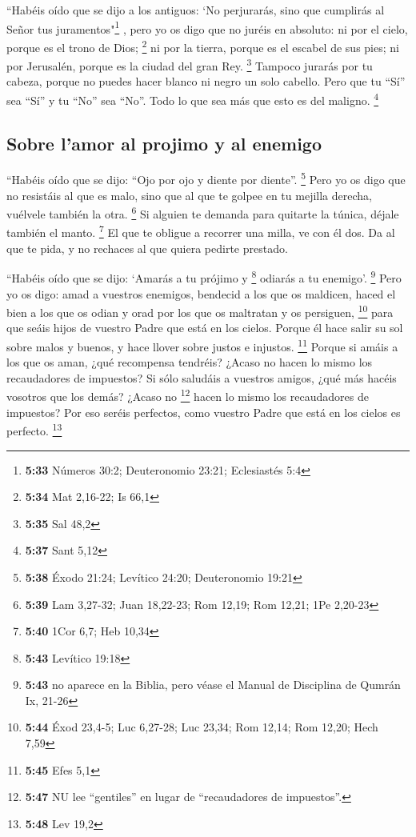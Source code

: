\begin{paracol}{2}
 ``Habéis oído que se dijo a los antiguos: `No
perjurarás, sino que cumplirás al Señor tus juramentos"\footnote{\textbf{5:33}
  Números 30:2; Deuteronomio 23:21; Eclesiastés 5:4} , 
pero yo os digo que no juréis en absoluto: ni por el cielo, porque es el
trono de Dios; \footnote{\textbf{5:34} Mat 2,16-22; Is 66,1}
 ni por la tierra, porque es el escabel de sus pies; ni
por Jerusalén, porque es la ciudad del gran Rey. \footnote{\textbf{5:35}
  Sal 48,2}  Tampoco jurarás por tu cabeza, porque no
puedes hacer blanco ni negro un solo cabello.  Pero que
tu ``Sí'' sea ``Sí'' y tu ``No'' sea ``No''. Todo lo que sea más que
esto es del maligno. \footnote{\textbf{5:37} Sant 5,12}

\hypertarget{sobre-lamor-al-projimo-y-al-enemigo}{%
\subsection{Sobre l'amor al projimo y al
enemigo}\label{sobre-lamor-al-projimo-y-al-enemigo}}

 ``Habéis oído que se dijo: ``Ojo por ojo y diente por
diente''. \footnote{\textbf{5:38} Éxodo 21:24; Levítico 24:20;
  Deuteronomio 19:21}  Pero yo os digo que no resistáis
al que es malo, sino que al que te golpee en tu mejilla derecha,
vuélvele también la otra. \footnote{\textbf{5:39} Lam 3,27-32; Juan
  18,22-23; Rom 12,19; Rom 12,21; 1Pe 2,20-23}  Si
alguien te demanda para quitarte la túnica, déjale también el manto.
\footnote{\textbf{5:40} 1Cor 6,7; Heb 10,34}  El que te
obligue a recorrer una milla, ve con él dos.  Da al que
te pida, y no rechaces al que quiera pedirte prestado.

 ``Habéis oído que se dijo: `Amarás a tu prójimo y
\footnote{\textbf{5:43} Levítico 19:18} odiarás a tu enemigo'.
\footnote{\textbf{5:43} no aparece en la Biblia, pero véase el Manual de
  Disciplina de Qumrán Ix, 21-26}  Pero yo os digo: amad
a vuestros enemigos, bendecid a los que os maldicen, haced el bien a los
que os odian y orad por los que os maltratan y os persiguen, \footnote{\textbf{5:44}
  Éxod 23,4-5; Luc 6,27-28; Luc 23,34; Rom 12,14; Rom 12,20; Hech 7,59}
 para que seáis hijos de vuestro Padre que está en los
cielos. Porque él hace salir su sol sobre malos y buenos, y hace llover
sobre justos e injustos. \footnote{\textbf{5:45} Efes 5,1}
 Porque si amáis a los que os aman, ¿qué recompensa
tendréis? ¿Acaso no hacen lo mismo los recaudadores de impuestos?
 Si sólo saludáis a vuestros amigos, ¿qué más hacéis
vosotros que los demás? ¿Acaso no \footnote{\textbf{5:47} NU lee
  ``gentiles'' en lugar de ``recaudadores de impuestos''.} hacen lo
mismo los recaudadores de impuestos?  Por eso seréis
perfectos, como vuestro Padre que está en los cielos es perfecto.
\footnote{\textbf{5:48} Lev 19,2}


\end{paracol}
